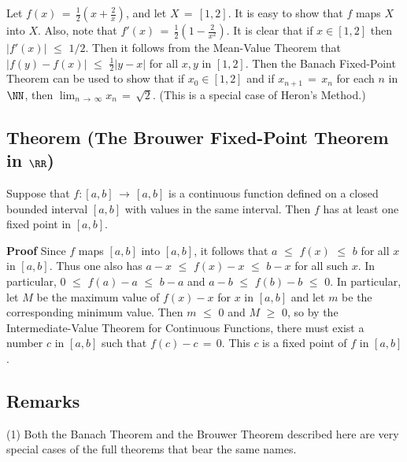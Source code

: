 \V

        Let $f(x) \,=\, {\displaystyle \frac{1}{2}\left(x+\frac{2}{x}\right)}$, and let $X \,=\, [1,2]$.
    It is easy to show that $f$ maps $X$ into $X$.
    Also, note that $f'(x) \,=\, {\displaystyle \frac{1}{2}\left(1-\frac{2}{x^{2}}\right)}$.
    It is clear that if $x{\in}[1,2]$ then $|f'(x)|\,\,{\leq}\,\,1/2$.
    Then it follows from the Mean-Value Theorem that $|f(y)-f(x)|\,\,{\leq}\,\,\frac{1}{2}|y-x|$ for all $x,y$ in $[1,2]$.
    Then the Banach Fixed-Point Theorem can be used to show that if $x_{0}{\in}[1,2]$ and if $x_{n+1} \,=\, x_{n}$
    for each $n$ in ${\NN}$, then $\lim_{n \,{\rightarrow}\, {\infty}} x_{n} \,=\, \sqrt{2}$. (This is a special case of Heron's Method.)

\V
\V

             \subsection{\small{\bf Theorem} (The Brouwer Fixed-Point Theorem in ${\RR}$)}
            \label{ThmF35.80}

\V

        Suppose that $f:[a,b] \,{\rightarrow}\, [a,b]$ is a continuous function defined on a closed bounded interval $[a,b]$ with values in the same interval.
    Then $f$ has at least one fixed point in $[a,b]$.

\V

        {\bf Proof} Since $f$ maps $[a,b]$ into $[a,b]$, it follows that $a\,\,{\leq}\,\,f(x)\,\,{\leq}\,\,b$ for all $x$ in $[a,b]$.
    Thus one also has $a-x\,\,{\leq}\,\,f(x)-x\,\,{\leq}\,\,b-x$ for all such $x$.
    In particular, $0\,\,{\leq}\,\,f(a)-a\,\,{\leq}\,\,b-a$ and $a-b\,\,{\leq}\,\,f(b)-b\,\,{\leq}\,\,0$.
    In particular, let $M$ be the maximum value of $f(x)-x$ for $x$ in $[a,b]$ and let $m$ be the corresponding minimum value.
    Then $m\,\,{\leq}\,\,0$ and $M\,\,{\geq}\,\,0$, so by the Intermediate-Value Theorem for Continuous Functions,
    there must exist a number $c$ in $[a,b]$ such that $f(c)-c \,=\, 0$.
    This $c$ is a fixed point of $f$ in $[a,b]$.

\V
\V


             \subsection{\small{\bf Remarks}}
            \label{ThmF35.90}

\V

\hspace*{\parindent}(1) Both the Banach Theorem and the Brouwer Theorem described here are very special cases of the full theorems that bear the same names.

